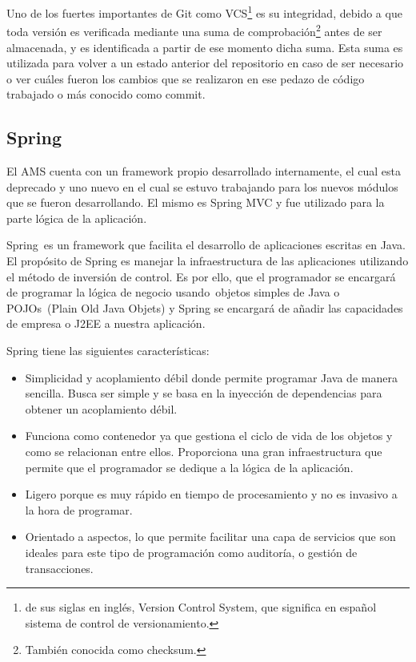 Uno de los fuertes importantes de Git como VCS\footnote{de sus siglas en inglés, Version Control System, que significa en español sistema de control de versionamiento.} es su integridad, debido a que toda versión es verificada mediante una suma de comprobación\footnote{También conocida como checksum.} antes de ser almacenada, y es identificada a partir de ese momento dicha suma. Esta suma es utilizada para volver a un estado anterior del repositorio en caso de ser necesario o ver cuáles fueron los cambios que se realizaron en ese pedazo de código trabajado o más conocido como commit\citep{chacon2014pro}.

\subsection{Spring}
El AMS cuenta con un framework propio desarrollado internamente, el cual esta deprecado y uno nuevo en el cual se estuvo trabajando para los nuevos módulos que se fueron desarrollando. El mismo es Spring MVC y fue utilizado para la parte lógica de la aplicación.

Spring es un framework que facilita el desarrollo de aplicaciones escritas en Java. El propósito de Spring es manejar la infraestructura de las aplicaciones utilizando el método de inversión de control. Es por ello, que el programador se encargará de programar la lógica de negocio usando objetos simples de Java o POJOs (Plain Old Java Objets) y Spring se encargará de añadir las capacidades de empresa o J2EE a nuestra aplicación\citep{bauer2005hibernate}.

Spring tiene las siguientes características:
\begin{itemize}
	\item Simplicidad y acoplamiento débil donde permite programar Java de manera sencilla. Busca ser simple y se basa en la inyección de dependencias para obtener un acoplamiento débil.
	\item Funciona como contenedor ya que gestiona el ciclo de vida de los objetos y como se relacionan entre ellos. Proporciona una gran infraestructura que permite que el programador se dedique a la lógica de la aplicación.
	\item Ligero porque es muy rápido en tiempo de procesamiento y no es invasivo a la hora de programar.
	\item Orientado a aspectos, lo que permite facilitar una capa de servicios que son ideales para este tipo de programación como auditoría, o gestión de transacciones.
\end{itemize} 

